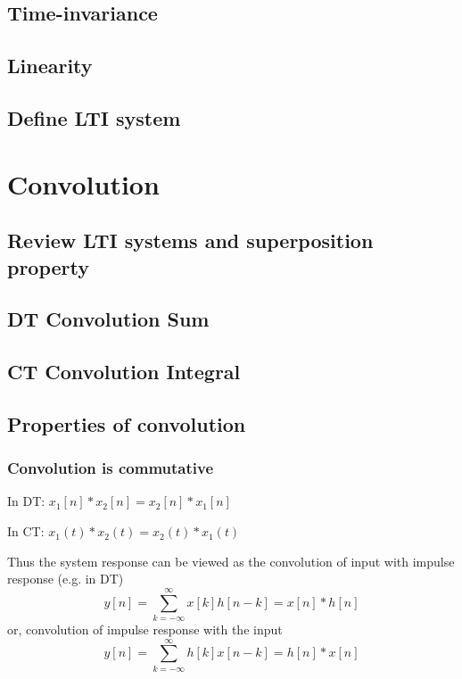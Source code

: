 \documentclass{article}
\begin{document}
\subsection{Time-invariance}
\label{sec:org0eb860c}
\subsection{Linearity}
\label{sec:org07e3ada}
\subsection{Define LTI system}
\label{sec:org920390a}

\newpage
\section{Convolution}
\label{sec:org9c1558d}
\subsection{Review LTI systems and superposition property}
\label{sec:orgc9b2a56}
\subsection{DT Convolution Sum}
\label{sec:org9ec80b8}
\subsection{CT Convolution Integral}
\label{sec:orge42c03e}
\subsection{Properties of convolution}
\label{sec:orgbed0c56}

\subsubsection{Convolution is commutative}

In DT: $x_1[n] * x_2[n] = x_2[n] * x_1[n]$


In CT: $x_1(t) * x_2(t) = x_2(t) * x_1(t)$


Thus the system response can be viewed as the convolution of input with impulse response (e.g. in DT)
    \[
      y[n] = \sum\limits_{k=-\infty}^{\infty} x[k]h[n-k] = x[n] * h[n]
    \]
    or, convolution of impulse response with the input
    \[
      y[n] = \sum\limits_{k=-\infty}^{\infty} h[k]x[n-k] = h[n] * x[n]
    \]
\end{document}
